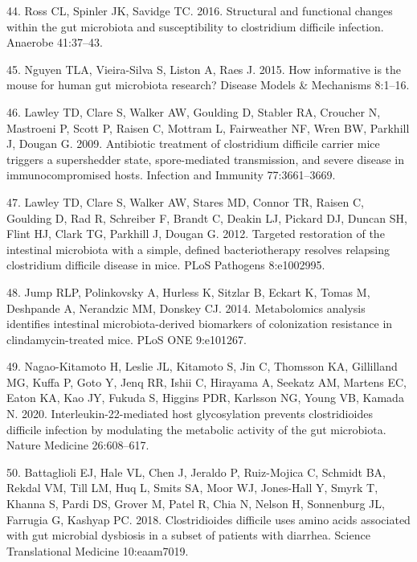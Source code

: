 \documentclass[11pt,]{article}
\begin{document}
\hypertarget{ref-Ross2016}{}
44. Ross CL, Spinler JK, Savidge TC. 2016. Structural and functional
changes within the gut microbiota and susceptibility to clostridium
difficile infection. Anaerobe 41:37--43.

\hypertarget{ref-Nguyen2015}{}
45. Nguyen TLA, Vieira-Silva S, Liston A, Raes J. 2015. How informative
is the mouse for human gut microbiota research? Disease Models \&
Mechanisms 8:1--16.

\hypertarget{ref-Lawley2009}{}
46. Lawley TD, Clare S, Walker AW, Goulding D, Stabler RA, Croucher N,
Mastroeni P, Scott P, Raisen C, Mottram L, Fairweather NF, Wren BW,
Parkhill J, Dougan G. 2009. Antibiotic treatment of clostridium
difficile carrier mice triggers a supershedder state, spore-mediated
transmission, and severe disease in immunocompromised hosts. Infection
and Immunity 77:3661--3669.

\hypertarget{ref-Lawley2012}{}
47. Lawley TD, Clare S, Walker AW, Stares MD, Connor TR, Raisen C,
Goulding D, Rad R, Schreiber F, Brandt C, Deakin LJ, Pickard DJ, Duncan
SH, Flint HJ, Clark TG, Parkhill J, Dougan G. 2012. Targeted restoration
of the intestinal microbiota with a simple, defined bacteriotherapy
resolves relapsing clostridium difficile disease in mice. PLoS Pathogens
8:e1002995.

\hypertarget{ref-Jump2014}{}
48. Jump RLP, Polinkovsky A, Hurless K, Sitzlar B, Eckart K, Tomas M,
Deshpande A, Nerandzic MM, Donskey CJ. 2014. Metabolomics analysis
identifies intestinal microbiota-derived biomarkers of colonization
resistance in clindamycin-treated mice. PLoS ONE 9:e101267.

\hypertarget{ref-NagaoKitamoto2020}{}
49. Nagao-Kitamoto H, Leslie JL, Kitamoto S, Jin C, Thomsson KA,
Gillilland MG, Kuffa P, Goto Y, Jenq RR, Ishii C, Hirayama A, Seekatz
AM, Martens EC, Eaton KA, Kao JY, Fukuda S, Higgins PDR, Karlsson NG,
Young VB, Kamada N. 2020. Interleukin-22-mediated host glycosylation
prevents clostridioides difficile infection by modulating the metabolic
activity of the gut microbiota. Nature Medicine 26:608--617.

\hypertarget{ref-Battaglioli2018}{}
50. Battaglioli EJ, Hale VL, Chen J, Jeraldo P, Ruiz-Mojica C, Schmidt
BA, Rekdal VM, Till LM, Huq L, Smits SA, Moor WJ, Jones-Hall Y, Smyrk T,
Khanna S, Pardi DS, Grover M, Patel R, Chia N, Nelson H, Sonnenburg JL,
Farrugia G, Kashyap PC. 2018. Clostridioides difficile uses amino acids
associated with gut microbial dysbiosis in a subset of patients with
diarrhea. Science Translational Medicine 10:eaam7019.
\end{document}
